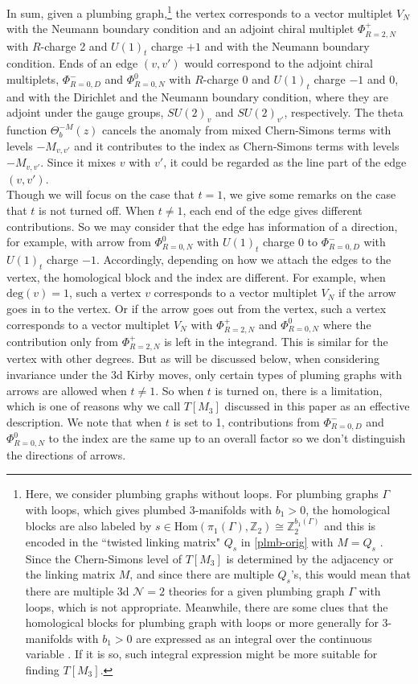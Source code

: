 \documentclass[11pt,hyper,a4paper]{article}
\begin{document}
In sum, given a plumbing graph,\footnote{Here, we consider plumbing graphs without loops.
For plumbing graphs $\Gamma$ with loops, which gives plumbed 3-manifolds with $b_1>0$, the homological blocks are also labeled by $s \in \text{Hom}(\pi_1(\Gamma), \mathbb{Z}_2) \cong \mathbb{Z}_2^{b_1(\Gamma)}$ and this is encoded in the ``twisted linking matrix" $Q_s$ in \eqref{plmb-orig} with $M=Q_s$ \cite{Chun-Gukov-Park-Sopenko}. 
Since the Chern-Simons level of $T[M_3]$ is determined by the adjacency or the linking matrix $M$, and since there are multiple $Q_s$'s, this would mean that there are multiple 3d $\mathcal{N}=2$ theories for a given plumbing graph $\Gamma$ with loops, which is not appropriate.
Meanwhile, there are some clues that the homological blocks for plumbing graph with loops or more generally for 3-manifolds with $b_1 >0$ are expressed as an integral over the continuous variable \cite{Chun-Gukov-Park-Sopenko}. 
If it is so, such integral expression might be more suitable for finding $T[M_3]$.
} the vertex corresponds to a vector multiplet $V_N$ with the Neumann boundary condition and an adjoint chiral multiplet $\Phi_{R=2,N}^{+}$ with $R$-charge 2 and $U(1)_t$ charge $+1$ and with the Neumann boundary condition.
Ends of an edge $(v,v')$ would correspond to the adjoint chiral multiplets, $\Phi_{R=0,D}^{-}$ and $\Phi_{R=0,N}^{0}$ with $R$-charge 0 and $U(1)_t$ charge $-1$ and $0$, and with the Dirichlet and the Neumann boundary condition, where they are adjoint under the gauge groups, $SU(2)_v$ and $SU(2)_{v'}$, respectively.
The theta function $\Theta_b^{-M}(z)$ cancels the anomaly from mixed Chern-Simons terms with levels $-M_{v, v'}$ and it contributes to the index as Chern-Simons terms with levels $-M_{v, v'}$. Since it mixes $v$ with $v'$, it could be regarded as the line part of the edge $(v,v')$.	\\


Though we will focus on the case that $t=1$, we give some remarks on the case that $t$ is not turned off.
When $t \neq 1$, each end of the edge gives different contributions.
So we may consider that the edge has information of a direction, for example, with arrow from $\Phi_{R=0,N}^0$ with $U(1)_t$ charge 0 to $\Phi_{R=0,D}^-$ with $U(1)_t$ charge $-1$.
Accordingly, depending on how we attach the edges to the vertex, the homological block and the index are different.
For example, when $\text{deg}(v)=1$, such a vertex $v$ corresponds to a vector multiplet $V_N$ if the arrow goes in to the vertex.
Or if the arrow goes out from the vertex, such a vertex corresponds to a vector multiplet $V_N$ with $\Phi_{R=2,N}^{+}$ and $\Phi_{R=0,N}^{0}$ where the contribution only from $\Phi_{R=2,N}^{+}$ is left in the integrand.
This is similar for the vertex with other degrees.
But as will be discussed below, when considering invariance under the 3d Kirby moves, only certain types of pluming graphs with arrows are allowed when $t \neq 1$.
So when $t$ is turned on, there is a limitation, which is one of reasons why we call $T[M_3]$ discussed in this paper as an effective description.
We note that when $t$ is set to 1, contributions from $\Phi_{R=0,D}^{-}$ and $\Phi_{R=0,N}^{0}$ to the index are the same up to an overall factor so we don't distinguish the directions of arrows.
\end{document}
